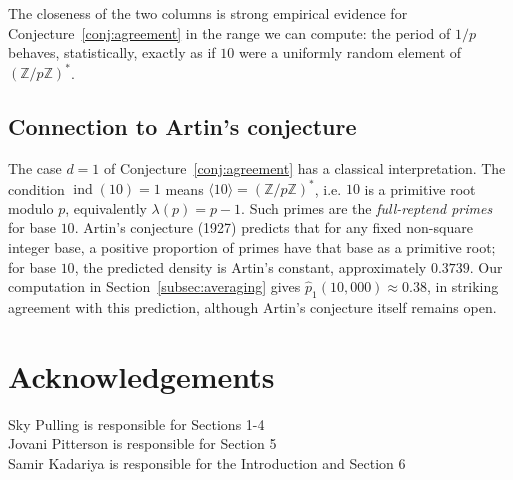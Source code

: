 \documentclass[12pt]{amsart}
\theoremstyle{definition}
\theoremstyle{remark}
\newcommand{\Z}{\mathbb{Z}}
\newcommand{\ind}{\operatorname{ind}}
\begin{document}
The closeness of the two columns is strong empirical evidence for
Conjecture~\ref{conj:agreement} in the range we can compute: the period
of $1/p$ behaves, statistically, exactly as if $10$ were a uniformly
random element of $(\Z/p\Z)^*$.

\subsection{Connection to Artin's conjecture}\label{subsec:artin}

The case $d = 1$ of Conjecture~\ref{conj:agreement} has a classical
interpretation. The condition $\ind(10) = 1$ means $\langle 10 \rangle =
(\Z/p\Z)^*$, i.e. $10$ is a primitive root modulo $p$, equivalently
$\lambda(p) = p - 1$. Such primes are the \emph{full-reptend primes}
for base $10$. Artin's conjecture (1927) predicts that for any fixed
non-square integer base, a positive proportion of primes have that base
as a primitive root; for base $10$, the predicted density is Artin's
constant, approximately $0.3739$. Our computation in
Section~\ref{subsec:averaging} gives $\widehat{p}_1(10{,}000) \approx
0.38$, in striking agreement with this prediction, although Artin's
conjecture itself remains open.
\section{Acknowledgements}
Sky Pulling is responsible for Sections 1-4\\
Jovani Pitterson is responsible for Section 5\\
Samir Kadariya is responsible for the Introduction and Section 6
\end{document}
